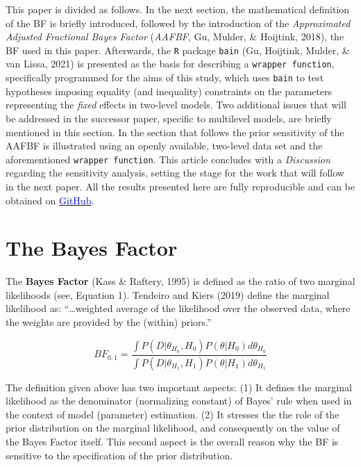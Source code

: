 \documentclass[
  english,
  man]{apa6}
\begin{document}
This paper is divided as follows. In the next section, the mathematical definition of the BF is briefly introduced, followed by the introduction of the \emph{Approximated Adjusted Fractional Bayes Factor} (\emph{AAFBF}, Gu, Mulder, \& Hoijtink, 2018), the BF used in this paper. Afterwards, the \texttt{R} package \texttt{bain} (Gu, Hoijtink, Mulder, \& van Lissa, 2021) is presented as the basis for describing a \texttt{wrapper\ function}, specifically programmed for the aims of this study, which uses \texttt{bain} to test hypotheses imposing equality (and inequality) constraints on the parameters representing the \emph{fixed} effects in two-level models. Two additional issues that will be addressed in the successor paper, specific to multilevel models, are briefly mentioned in this section. In the section that follows the prior sensitivity of the AAFBF is illustrated using an openly available, two-level data set and the aforementioned \texttt{wrapper\ function}. This article concludes with a \emph{Discussion} regarding the sensitivity analysis, setting the stage for the work that will follow in the next paper. All the results presented here are fully reproducible and can be obtained on \href{https://github.com/sekulovskin/Research-report}{\textcolor{blue}{GitHub}}.

\hypertarget{the-bayes-factor}{%
\section{The Bayes Factor}\label{the-bayes-factor}}

The \textbf{Bayes Factor} (Kass \& Raftery, 1995) is defined as the ratio of two marginal likelihoods (see, Equation 1). Tendeiro and Kiers (2019) define the marginal likelihood as: ``\ldots weighted average of the likelihood over the observed data, where the weights are provided by the (within) priors.''

\begin{equation}
BF_{0,1} = \frac{\int P(D|\theta_{H_0}, H_0) P(\theta|H_0) d\theta_{H_0}}{\int P(D|\theta_{H_1}, H_1) P(\theta|H_1) d\theta_{H_1}}
\end{equation}

\newpage

The definition given above has two important aspects: (1) It defines the marginal likelihood as the denominator (normalizing constant) of Bayes' rule when used in the context of model (parameter) estimation. (2) It stresses the the role of the prior distribution on the marginal likelihood, and consequently on the value of the Bayes Factor itself. This second aspect is the overall reason why the BF is sensitive to the specification of the prior distribution.
\end{document}
